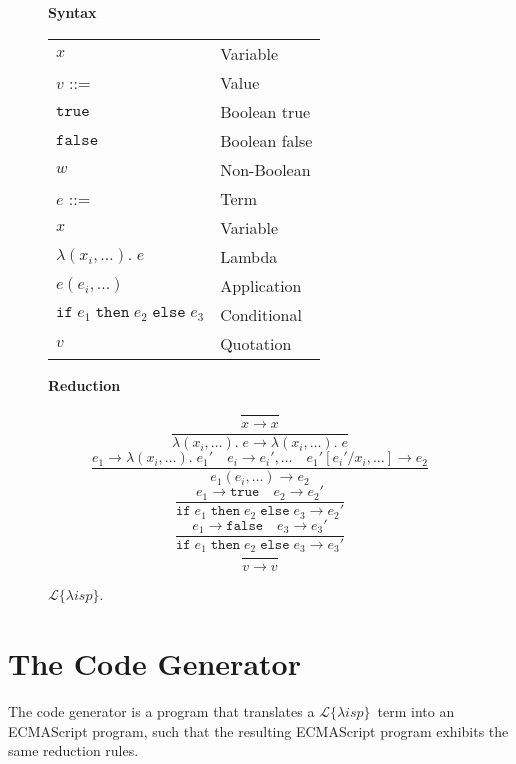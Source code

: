 \documentclass[a4paper]{article}
\newcommand{\lisp}{\ensuremath{\mathcal{L}\{\lambda isp\}}}
\begin{document}
\begin{figure}[h]
\label{fig:lisp}
\caption{\lisp.}

{\bf Syntax}

\begin{tabular}{ll}
$x$ & Variable \\
$v$ ::= & Value \\
\hspace{1em} $\mathtt{true}$ & \hspace{1em} Boolean true \\
\hspace{1em} $\mathtt{false}$ & \hspace{1em} Boolean false \\
\hspace{1em} $w$ & \hspace{1em} Non-Boolean \\
$e$ ::= & Term \\
\hspace{1em} $x$ & \hspace{1em} Variable \\
\hspace{1em} $\lambda(x_i, \dots).\;e$ & \hspace{1em} Lambda \\
\hspace{1em} $e(e_i, \dots)$ & \hspace{1em} Application \\
\hspace{1em} $\mathtt{if}\;e_1\;\mathtt{then}\;e_2\;\mathtt{else}\;e_3$ & \hspace{1em} Conditional \\
\hspace{1em} $v$ & \hspace{1em} Quotation \\
\end{tabular}

\hrulefill

{\bf Reduction}

$$\frac{}{x \rightarrow x}$$
$$\frac{}{\lambda(x_i, \dots).\;e \rightarrow \lambda(x_i, \dots).\;e}$$
$$\frac{e_1 \rightarrow \lambda(x_i, \dots).\;e_1' \quad e_i \rightarrow e_i', \dots \quad e_1'[e_i' / x_i, \dots] \rightarrow e_2}{e_1(e_i, \dots) \rightarrow e_2}$$
$$\frac{e_1 \rightarrow \mathtt{true} \quad e_2 \rightarrow e_2'}{\mathtt{if}\;e_1\;\mathtt{then}\;e_2\;\mathtt{else}\;e_3 \rightarrow e_2'}$$
$$\frac{e_1 \rightarrow \mathtt{false} \quad e_3 \rightarrow e_3'}{\mathtt{if}\;e_1\;\mathtt{then}\;e_2\;\mathtt{else}\;e_3 \rightarrow e_3'}$$
$$\frac{}{v \rightarrow v}$$

\end{figure}

\section{The Code Generator}

The code generator is a program that translates a \lisp\ term into an ECMAScript program, such that the resulting ECMAScript program exhibits the same reduction rules.
\end{document}
